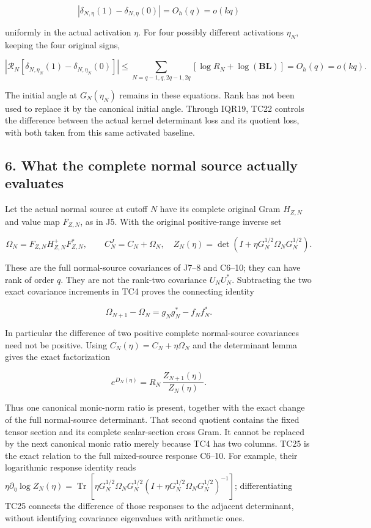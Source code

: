 \documentclass[11pt]{article}
\begin{document}
\[
|\delta_{N,\eta}(1)-\delta_{N,\eta}(0)|=O_h(q)=o(kq)
\tag{TC21}
\]

uniformly in the actual activation \(\eta\). For four possibly different activations \(\eta_N\), keeping the four original signs,

\[
\left|\mathcal R_N[\delta_{N,\eta_N}(1)-\delta_{N,\eta_N}(0)]\right|
\le\sum_{N=q-1,q,2q-1,2q}
\left[\log R_N+\log(\mathbf B\mathbf L)\right]
=O_h(q)=o(kq).
\tag{TC22}
\]

The initial angle at \(G_N(\eta_N)\) remains in these equations. Rank has not been used to replace it by the canonical initial angle. Through IQR19, TC22 controls the difference between the actual kernel determinant loss and its quotient loss, with both taken from this same activated baseline.

\subsection{6. What the complete normal source actually evaluates}\label{what-the-complete-normal-source-actually-evaluates}

Let the actual normal source at cutoff \(N\) have its complete original Gram \(H_{Z,N}\) and value map \(F_{Z,N}\), as in J5. With the original positive-range inverse set

\[
\Omega_N=F_{Z,N}H_{Z,N}^+F_{Z,N}^*,\qquad
C_N^J=C_N+\Omega_N,
\quad Z_N(\eta)=\det(I+\eta G_N^{1/2}\Omega_NG_N^{1/2}).
\tag{TC23}
\]

These are the full normal-source covariances of J7--8 and C6--10; they can have rank of order \(q\). They are not the rank-two covariance \(U_NU_N^*\). Subtracting the two exact covariance increments in TC4 proves the connecting identity

\[
\boxed{\Omega_{N+1}-\Omega_N=g_Ng_N^*-f_Nf_N^*.}
\tag{TC24}
\]

In particular the difference of two positive complete normal-source covariances need not be positive. Using \(C_N(\eta)=C_N+\eta\Omega_N\) and the determinant lemma gives the exact factorization

\[
\boxed{
e^{D_N(\eta)}
=R_N\,\frac{Z_{N+1}(\eta)}{Z_N(\eta)}.
}
\tag{TC25}
\]

Thus one canonical monic-norm ratio is present, together with the exact change of the full normal-source determinant. That second quotient contains the fixed tensor section and its complete scalar-section cross Gram. It cannot be replaced by the next canonical monic ratio merely because TC4 has two columns. TC25 is the exact relation to the full mixed-source response C6--10. For example, their logarithmic response identity reads \(\eta\partial_\eta\log Z_N(\eta)=\operatorname{Tr}[\eta G_N^{1/2}\Omega_NG_N^{1/2}(I+\eta G_N^{1/2}\Omega_NG_N^{1/2})^{-1}]\); differentiating TC25 connects the difference of those responses to the adjacent determinant, without identifying covariance eigenvalues with arithmetic ones.
\end{document}
